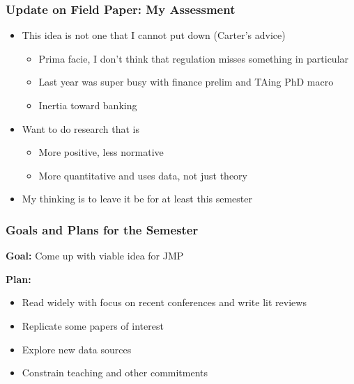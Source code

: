 \documentclass[usenames,dvipsnames, handout]{beamer}
\begin{document}
\begin{frame}
\frametitle{Update on Field Paper: My Assessment}
\small
\begin{itemize}[<+->]
\item This idea is not one that I cannot put down (Carter's advice)
\begin{itemize}[<+->]
\item Prima facie, I don't think that regulation misses something in particular
\item Last year was super busy with finance prelim and TAing PhD macro
\item Inertia toward banking
\end{itemize}
\bigskip
\item Want to do research that is
\begin{itemize}[<+->]
\item More positive, less normative
\item More quantitative and uses data, not just theory
\end{itemize}
\bigskip
\item My thinking is to leave it be for at least this semester
\end{itemize}
\end{frame}

\begin{frame}
\frametitle{Goals and Plans for the Semester}
\small
\textbf{Goal:} Come up with viable idea for JMP

\pause
\bigskip

\textbf{Plan:}
\bigskip
\begin{itemize}[<+->]
\item Read widely with focus on recent conferences and write lit reviews
\bigskip
\item Replicate some papers of interest
\bigskip
\item Explore new data sources
\bigskip
\item Constrain teaching and other commitments
\end{itemize}
\end{frame}
\end{document}
